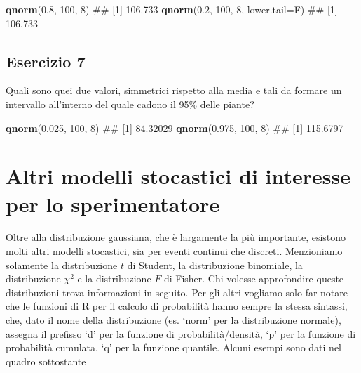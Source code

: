 \documentclass[a4paper,12pt,oneside]{book}
\newenvironment{Shaded}{\begin{snugshade}}{\end{snugshade}}
\newcommand{\KeywordTok}[1]{\textcolor[rgb]{0.13,0.29,0.53}{\textbf{#1}}}
\newcommand{\DataTypeTok}[1]{\textcolor[rgb]{0.13,0.29,0.53}{#1}}
\newcommand{\DecValTok}[1]{\textcolor[rgb]{0.00,0.00,0.81}{#1}}
\newcommand{\FloatTok}[1]{\textcolor[rgb]{0.00,0.00,0.81}{#1}}
\newcommand{\NormalTok}[1]{#1}
\theoremstyle{definition}
\theoremstyle{definition}
\theoremstyle{definition}
\theoremstyle{remark}
\begin{document}
\begin{Shaded}
\begin{Highlighting}[]
\KeywordTok{qnorm}\NormalTok{(}\FloatTok{0.8}\NormalTok{, }\DecValTok{100}\NormalTok{, }\DecValTok{8}\NormalTok{)}
\NormalTok{## [1] 106.733}
\KeywordTok{qnorm}\NormalTok{(}\FloatTok{0.2}\NormalTok{, }\DecValTok{100}\NormalTok{, }\DecValTok{8}\NormalTok{, }\DataTypeTok{lower.tail=}\NormalTok{F)}
\NormalTok{## [1] 106.733}
\end{Highlighting}
\end{Shaded}

\subsection{Esercizio 7}\label{esercizio-7}

Quali sono quei due valori, simmetrici rispetto alla media e tali da
formare un intervallo all'interno del quale cadono il 95\% delle piante?

\begin{Shaded}
\begin{Highlighting}[]
\KeywordTok{qnorm}\NormalTok{(}\FloatTok{0.025}\NormalTok{, }\DecValTok{100}\NormalTok{, }\DecValTok{8}\NormalTok{)}
\NormalTok{## [1] 84.32029}
\KeywordTok{qnorm}\NormalTok{(}\FloatTok{0.975}\NormalTok{, }\DecValTok{100}\NormalTok{, }\DecValTok{8}\NormalTok{)}
\NormalTok{## [1] 115.6797}
\end{Highlighting}
\end{Shaded}

\section{Altri modelli stocastici di interesse per lo
sperimentatore}\label{altri-modelli-stocastici-di-interesse-per-lo-sperimentatore}

Oltre alla distribuzione gaussiana, che è largamente la più importante,
esistono molti altri modelli stocastici, sia per eventi continui che
discreti. Menzioniamo solamente la distribuzione \(t\) di Student, la
distribuzione binomiale, la distribuzione \(\chi^2\) e la distribuzione
\(F\) di Fisher. Chi volesse approfondire queste distribuzioni trova
informazioni in seguito. Per gli altri vogliamo solo far notare che le
funzioni di R per il calcolo di probabilità hanno sempre la stessa
sintassi, che, dato il nome della distribuzione (es. `norm' per la
distribuzione normale), assegna il prefisso `d' per la funzione di
probabilità/densità, `p' per la funzione di probabilità cumulata, `q'
per la funzione quantile. Alcuni esempi sono dati nel quadro sottostante
\end{document}
